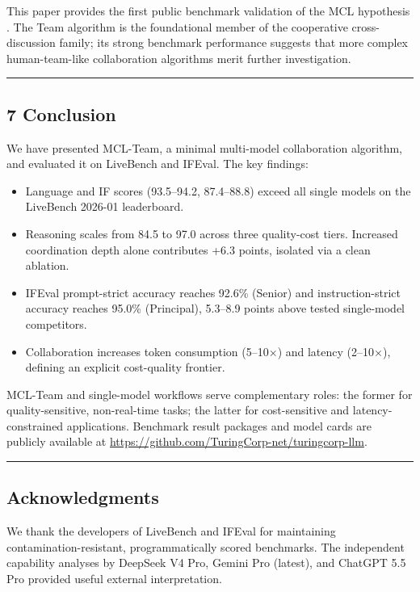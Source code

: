\documentclass[
]{article}
\providecommand{\tightlist}{%
  \setlength{\itemsep}{0pt}\setlength{\parskip}{0pt}}
\begin{document}
This paper provides the first public benchmark validation of the MCL hypothesis \cite{Zhang2025MCL}. The Team algorithm is the foundational member of the cooperative cross-discussion family; its strong benchmark performance suggests that more complex human-team-like collaboration algorithms merit further investigation.

\begin{center}\rule{0.5\linewidth}{0.5pt}\end{center}

\subsection{7 Conclusion}\label{conclusion}

We have presented MCL-Team, a minimal multi-model collaboration algorithm, and evaluated it on LiveBench and IFEval. The key findings:

\begin{itemize}
\tightlist
\item Language and IF scores (93.5--94.2, 87.4--88.8) exceed all single models on the LiveBench 2026-01 leaderboard.
\item Reasoning scales from 84.5 to 97.0 across three quality-cost tiers. Increased coordination depth alone contributes +6.3 points, isolated via a clean ablation.
\item IFEval prompt-strict accuracy reaches 92.6\% (Senior) and instruction-strict accuracy reaches 95.0\% (Principal), 5.3--8.9 points above tested single-model competitors.
\item Collaboration increases token consumption (5--10$\times$) and latency (2--10$\times$), defining an explicit cost-quality frontier.
\end{itemize}

MCL-Team and single-model workflows serve complementary roles: the former for quality-sensitive, non-real-time tasks; the latter for cost-sensitive and latency-constrained applications. Benchmark result packages and model cards are publicly available at \url{https://github.com/TuringCorp-net/turingcorp-llm}.

\begin{center}\rule{0.5\linewidth}{0.5pt}\end{center}

\subsection*{Acknowledgments}\label{acknowledgments}

We thank the developers of LiveBench and IFEval for maintaining contamination-resistant, programmatically scored benchmarks. The independent capability analyses by DeepSeek V4 Pro, Gemini Pro (latest), and ChatGPT 5.5 Pro provided useful external interpretation.

\nocite{*}


\end{document}
